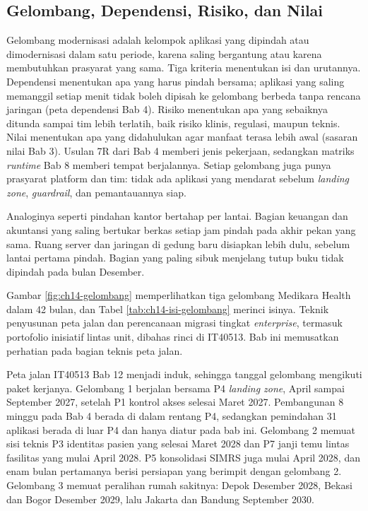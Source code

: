 \subsection{Gelombang, Dependensi, Risiko, dan Nilai}

Gelombang modernisasi adalah kelompok aplikasi yang dipindah atau dimodernisasi dalam satu periode,
karena saling bergantung atau karena membutuhkan prasyarat yang sama. Tiga kriteria menentukan isi
dan urutannya. Dependensi menentukan apa yang harus pindah bersama; aplikasi yang saling memanggil
setiap menit tidak boleh dipisah ke gelombang berbeda tanpa rencana jaringan (peta dependensi Bab
4). Risiko menentukan apa yang sebaiknya ditunda sampai tim lebih terlatih, baik risiko klinis,
regulasi, maupun teknis. Nilai menentukan apa yang didahulukan agar manfaat terasa lebih awal
(sasaran nilai Bab 3). Usulan 7R dari Bab 4 \cite{aws7r} memberi jenis pekerjaan, sedangkan matriks
\textit{runtime} Bab 8 memberi tempat berjalannya. Setiap gelombang juga punya prasyarat platform
dan tim: tidak ada aplikasi yang mendarat sebelum \textit{landing zone}, \textit{guardrail}, dan
pemantauannya siap.

Analoginya seperti pindahan kantor bertahap per lantai. Bagian keuangan dan akuntansi yang saling
bertukar berkas setiap jam pindah pada akhir pekan yang sama. Ruang server dan jaringan di gedung
baru disiapkan lebih dulu, sebelum lantai pertama pindah. Bagian yang paling sibuk menjelang tutup
buku tidak dipindah pada bulan Desember.

Gambar \ref{fig:ch14-gelombang} memperlihatkan tiga gelombang Medikara Health dalam 42 bulan, dan
Tabel \ref{tab:ch14-isi-gelombang} merinci isinya. Teknik penyusunan peta jalan dan perencanaan
migrasi tingkat \textit{enterprise}, termasuk portofolio inisiatif lintas unit, dibahas rinci di
IT40513. Bab ini memusatkan perhatian pada bagian teknis peta jalan.

Peta jalan IT40513 Bab 12 menjadi induk, sehingga tanggal gelombang mengikuti paket kerjanya.
Gelombang 1 berjalan bersama P4 \textit{landing zone}, April sampai September 2027, setelah P1
kontrol akses selesai Maret 2027. Pembangunan 8 minggu pada Bab 4 berada di dalam rentang P4,
sedangkan pemindahan 31 aplikasi berada di luar P4 dan hanya diatur pada bab ini. Gelombang 2 memuat
sisi teknis P3 identitas pasien yang selesai Maret 2028 dan P7 janji temu lintas fasilitas yang
mulai April 2028. P5 konsolidasi SIMRS juga mulai April 2028, dan enam bulan pertamanya berisi
persiapan yang berimpit dengan gelombang 2. Gelombang 3 memuat peralihan rumah sakitnya: Depok
Desember 2028, Bekasi dan Bogor Desember 2029, lalu Jakarta dan Bandung September 2030.

